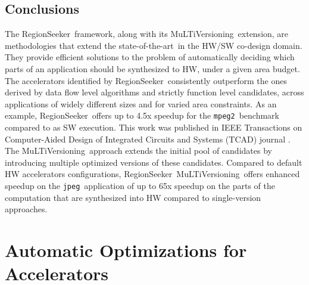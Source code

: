\documentclass[]{usiinfthesis}
\newcommand{\rseeker}{{RegionSeeker}}
\newcommand{\multi}{MuLTiVersioning}
\newcommand{\SoTA}{{state-of-the-art}}
\newcommand{\jpeg}{\texttt{jpeg}}
\newcommand{\mpeg}{\texttt{mpeg2}}
\begin{document}
\section{Conclusions}
\label{sec:rs_conclusions}

The \rseeker\ framework, along with its %
\multi\ extension, are methodologies that extend the \SoTA\ in the HW/SW co-design domain. They provide
efficient solutions to the problem of automatically deciding which parts of an application should
be synthesized to HW, under a given area budget. The accelerators identified by \rseeker\ 
consistently outperform the ones derived by data flow level algorithms and strictly function 
level candidates, across applications of widely different sizes and for varied area constraints.
As an example, \rseeker\ offers up to 4.5x speedup for the \mpeg\ benchmark compared to as SW
execution. This work was published in IEEE Transactions on Computer-Aided Design of Integrated 
Circuits and Systems (TCAD) journal \cite{ZacharopoulosApr19}.
The \multi\ approach extends the initial pool of candidates by introducing multiple optimized
versions of these candidates. Compared
to default HW accelerators configurations, \rseeker\ \multi\ offers enhanced speedup on the 
\jpeg\ application of up
to 65x speedup on the parts of the computation that 
are synthesized into HW compared to single-version approaches.





%
%
%
%
%  
%
%
%
%
%

\chapter{Automatic Optimizations for Accelerators}
\end{document}
